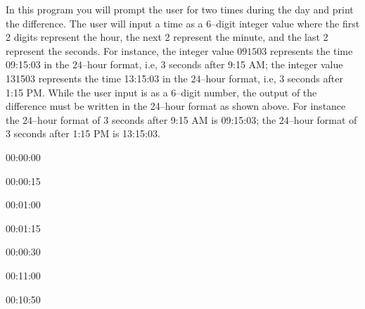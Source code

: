 In this program you will prompt the user for two times during the day and print the difference. The
user will input a time as a $6$--digit integer value where the first 2 digits represent the hour, the next 2
represent the minute, and the last 2 represent the seconds. For instance, the integer value $091503$
represents the time 09:15:03 in the $24$--hour format, i.e, 3 seconds after 9:15 AM; the integer value
131503 represents the time 13:15:03 in the $24$--hour format, i.e, 3 seconds after 1:15 PM. While the
user input is as a 6--digit number, the output of the difference must be written in the 24--hour format as
shown above. For instance the $24$--hour format of $3$ seconds after 9:15 AM is 09:15:03; the 24--hour
format of 3 seconds after 1:15 PM is 13:15:03.

\resett
\nextt
\begin{console}[commandchars=\\\{\}]
00:00:00
\end{console}

\nextt
\begin{console}[commandchars=\\\{\}]
00:00:15
\end{console}

\nextt
\begin{console}[commandchars=\\\{\}]
00:01:00
\end{console}

\nextt
\begin{console}[commandchars=\\\{\}]
00:01:15
\end{console}

\nextt
\begin{console}[commandchars=\\\{\}]
00:00:30
\end{console}

\nextt
\begin{console}[commandchars=\\\{\}]
00:11:00
\end{console}

\nextt
\begin{console}[commandchars=\\\{\}]
00:10:50
\end{console}

